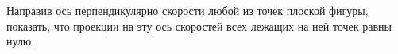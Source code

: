 Направив ось перпендикулярно скорости любой из точек плоской фигуры, показать, что проекции на эту ось скоростей
всех лежащих на ней точек равны нулю.